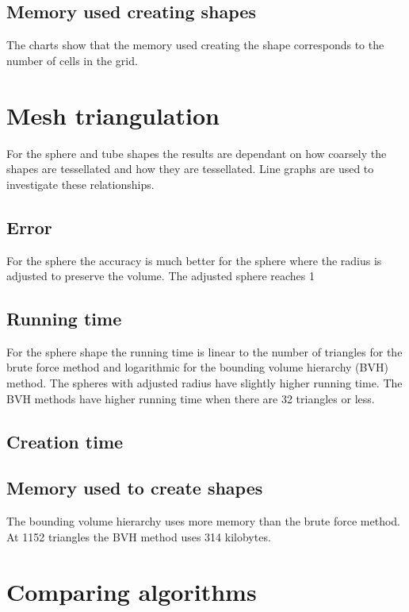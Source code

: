 \documentclass[11pt,twoside,a4paper]{report}
\begin{document}
\subsection{Memory used creating shapes}
The charts show that the memory used creating the shape corresponds to the number of cells in the grid.

\section{Mesh triangulation}
For the sphere and tube shapes the results are dependant on how coarsely the shapes are tessellated and how they are tessellated. Line graphs are used to investigate these relationships.
\subsection{Error}

For the sphere the accuracy is much better for the sphere where the radius is adjusted to preserve the volume. The adjusted sphere reaches 1%
\subsection{Running time}

For the sphere shape the running time is linear to the number of triangles for the brute force method and logarithmic for the bounding volume hierarchy (BVH) method. The spheres with adjusted radius have slightly higher running time. The BVH methods have higher running time when there are 32 triangles or less.

\subsection{Creation time}

\subsection{Memory used to create shapes}
The bounding volume hierarchy uses more memory than the brute force method.  At 1152 triangles the BVH method uses 314 kilobytes.

\section{Comparing algorithms}
\end{document}
